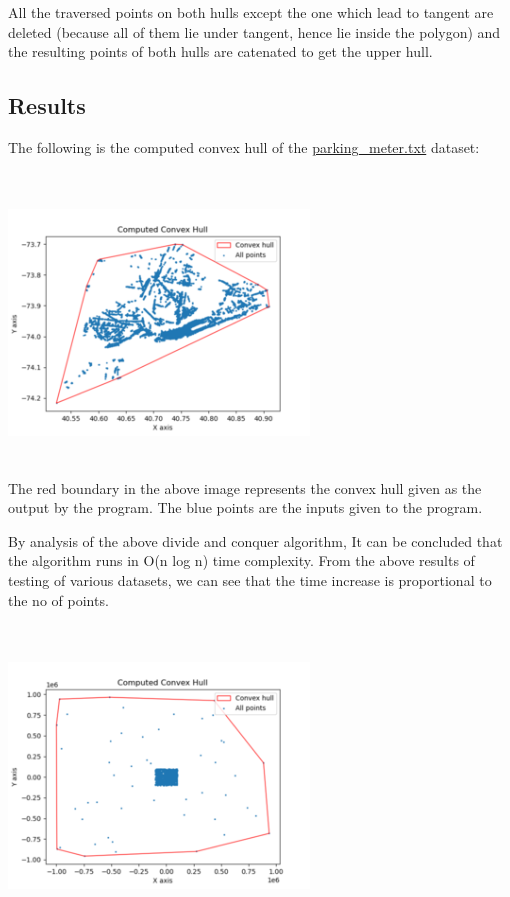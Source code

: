 All the traversed points on both hulls except the one which lead to
tangent are deleted (because all of them lie under tangent, hence lie
inside the polygon) and the resulting points of both hulls are catenated
to get the upper hull.

\hypertarget{results}{%
\subsection{Results}\label{results}}

The following is the computed convex hull of the
\href{./datasets/parking_meter.txt}{parking\_meter.txt} dataset:

\includegraphics[width=8cm,height=8cm]{img/CHparkingmeter.png}\\

The red boundary in the above image represents the convex hull given as
the output by the program. The blue points are the inputs given to the
program.

By analysis of the above divide and conquer algorithm, It can be
concluded that the algorithm runs in O(n log n) time complexity. From
the above results of testing of various datasets, we can see that the
time increase is proportional to the no of points.

\includegraphics[width=8cm,height=8cm]{img/CHradial.png}\\

